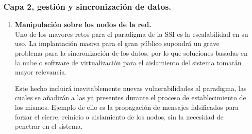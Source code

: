 \documentclass[../main.tex]{subfiles}
\begin{document}
\newpage
\subsubsection{Capa 2, gestión y sincronización de datos.}
\begin{enumerate}[label=\textbf{R2.\arabic*}, leftmargin=48pt]
    \item \textbf{Manipulación sobre los nodos de la red.}\label{R2.1}
    \\ Uno de los mayores retos para el paradigma de la \acrshort{SSI} es la escalabilidad en su uso. La implantación masiva para el gran público supondrá un grave problema para la sincronización de los datos, por lo que soluciones basadas en la nube o software de virtualización para el aislamiento del sistema tomarán mayor relevancia. 
    
    Este hecho incluirá inevitablemente nuevas vulnerabilidades al paradigma, las cuales se añadirán a las ya presentes durante el proceso de establecimiento de los mismos. Ejemplo de ello es la propagación de mensajes falsificados para forzar el cierre, reinicio o aislamiento de los nodos, sin la necesidad de penetrar en el sistema.


\end{enumerate}
\end{document}
